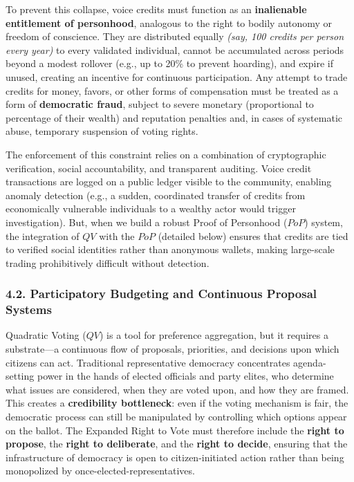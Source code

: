 To prevent this collapse, voice credits must function as an
\textbf{inalienable entitlement of personhood}, analogous to the right
to bodily autonomy or freedom of conscience. They are distributed
equally \emph{(say, 100 credits per person every year)} to every
validated individual, cannot be accumulated across periods beyond a
modest rollover (e.g., up to 20\% to prevent hoarding), and expire if
unused, creating an incentive for continuous participation. Any attempt
to trade credits for money, favors, or other forms of compensation must
be treated as a form of \textbf{democratic fraud}, subject to severe
monetary (proportional to percentage of their wealth) and reputation
penalties and, in cases of systematic abuse, temporary suspension of
voting rights.

The enforcement of this constraint relies on a combination of
cryptographic verification, social accountability, and transparent
auditing. Voice credit transactions are logged on a public ledger
visible to the community, enabling anomaly detection (e.g., a sudden,
coordinated transfer of credits from economically vulnerable individuals
to a wealthy actor would trigger investigation). But, when we build a
robust Proof of Personhood (\(PoP\)) system, the integration of \(QV\)
with the \(PoP\) (detailed below) ensures that credits are tied to
verified social identities rather than anonymous wallets, making
large-scale trading prohibitively difficult without detection.

\subsubsection{4.2. Participatory Budgeting and Continuous Proposal
Systems}\label{participatory-budgeting-and-continuous-proposal-systems}

Quadratic Voting (\(QV\)) is a tool for preference aggregation, but it
requires a substrate---a continuous flow of proposals, priorities, and
decisions upon which citizens can act. Traditional representative
democracy concentrates agenda-setting power in the hands of elected
officials and party elites, who determine what issues are considered,
when they are voted upon, and how they are framed. This creates a
\textbf{credibility bottleneck}: even if the voting mechanism is fair,
the democratic process can still be manipulated by controlling which
options appear on the ballot. The Expanded Right to Vote must therefore
include the \textbf{right to propose}, the \textbf{right to deliberate},
and the \textbf{right to decide}, ensuring that the infrastructure of
democracy is open to citizen-initiated action rather than being
monopolized by once-elected-representatives.

